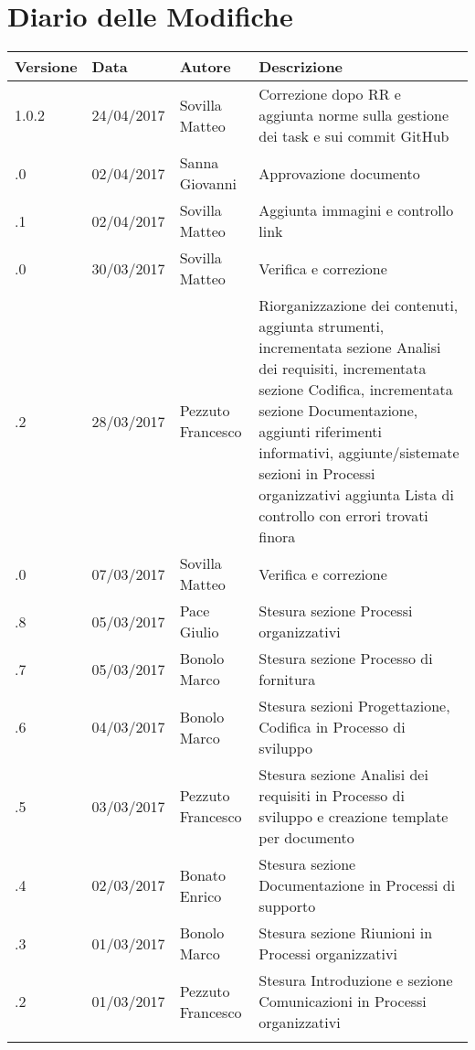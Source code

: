 \section*{Diario delle Modifiche}
\begin{longtabu} to \textwidth {
	X[4,l,p]
	X[4,l,p]
	X[4,l,p]
	X[8,l,p]}
	\toprule
		 Versione & Data & Autore & Descrizione \\
		\midrule
		\endhead
		
		1.0.2 & 24/04/2017 & Sovilla Matteo & Correzione dopo RR e aggiunta norme sulla gestione dei task e sui commit GitHub\\
		\addlinespace[0.2em]
		\midrule
		.0 & 02/04/2017 & Sanna Giovanni & Approvazione documento\\
		\addlinespace[0.2em]
		\midrule
		.1 & 02/04/2017 & Sovilla Matteo & Aggiunta immagini e controllo link\\
		\addlinespace[0.2em]
		\midrule
		.0 & 30/03/2017 & Sovilla Matteo & Verifica e correzione\\
		\addlinespace[0.2em]
		\midrule
		.2 & 28/03/2017 & Pezzuto Francesco & Riorganizzazione dei contenuti, aggiunta strumenti, incrementata sezione Analisi dei requisiti, incrementata sezione Codifica, incrementata sezione Documentazione, aggiunti riferimenti informativi, aggiunte/sistemate sezioni in Processi organizzativi aggiunta Lista di controllo con errori trovati finora\\
		\addlinespace[0.2em]
		\midrule
		.0 & 07/03/2017 & Sovilla Matteo & Verifica e correzione\\
		\addlinespace[0.2em]
		\midrule
		.8 & 05/03/2017 & Pace Giulio & Stesura sezione Processi organizzativi\\
		\addlinespace[0.2em]
		\midrule
		.7 & 05/03/2017 & Bonolo Marco & Stesura sezione Processo di fornitura\\
		\addlinespace[0.2em]
		\midrule
		.6 & 04/03/2017 & Bonolo Marco & Stesura sezioni Progettazione, Codifica in Processo di sviluppo\\
		\addlinespace[0.2em]
		\midrule
		.5 & 03/03/2017 & Pezzuto Francesco & Stesura sezione Analisi dei requisiti in Processo di sviluppo e creazione template per documento\\
		\addlinespace[0.2em]
		\midrule
		.4 & 02/03/2017 & Bonato Enrico & Stesura sezione Documentazione in Processi di supporto\\
		\addlinespace[0.2em]
		\midrule
		.3 & 01/03/2017 & Bonolo Marco & Stesura sezione Riunioni in Processi organizzativi\\
		\addlinespace[0.2em]
		\midrule
		.2 & 01/03/2017 & Pezzuto Francesco & Stesura Introduzione e sezione Comunicazioni in Processi organizzativi\\
		\addlinespace[0.2em]
		\midrule
		\addlinespace[0.2em]
		
\end{longtabu}
